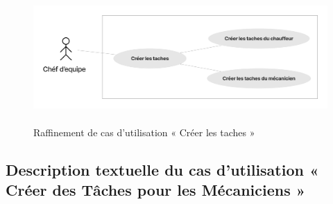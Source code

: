 \begin{figure}[h!]
  \centering
  \includegraphics[width=1\textwidth,height=5cm]{chap4.images/raf creer taches.png}
  \caption{Raffinement de cas d’utilisation « Créer les taches »}

\end{figure}





\subsection{Description textuelle du cas d’utilisation « Créer des Tâches pour les Mécaniciens  »}

